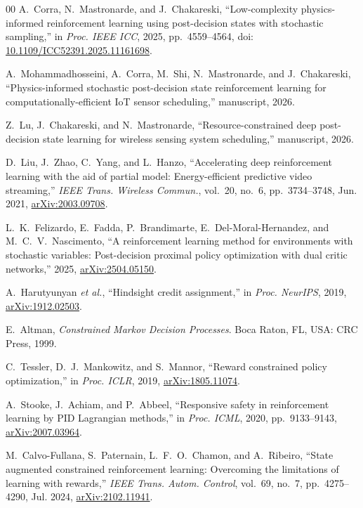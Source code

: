 \documentclass[conference]{IEEEtran}
\begin{document}
\begin{thebibliography}{00}
A.~Corra, N.~Mastronarde, and J.~Chakareski, ``Low-complexity physics-informed reinforcement learning using post-decision states with stochastic sampling,'' in \emph{Proc. IEEE ICC}, 2025, pp.~4559--4564, doi: \href{https://doi.org/10.1109/ICC52391.2025.11161698}{10.1109/ICC52391.2025.11161698}.

A.~Mohammadhosseini, A.~Corra, M.~Shi, N.~Mastronarde, and J.~Chakareski, ``Physics-informed stochastic post-decision state reinforcement learning for computationally-efficient IoT sensor scheduling,'' manuscript, 2026.

Z.~Lu, J.~Chakareski, and N.~Mastronarde, ``Resource-constrained deep post-decision state learning for wireless sensing system scheduling,'' manuscript, 2026.

D.~Liu, J.~Zhao, C.~Yang, and L.~Hanzo, ``Accelerating deep reinforcement learning with the aid of partial model: Energy-efficient predictive video streaming,'' \emph{IEEE Trans. Wireless Commun.}, vol.~20, no.~6, pp.~3734--3748, Jun. 2021, \href{https://arxiv.org/abs/2003.09708}{arXiv:2003.09708}.

L.~K.~Felizardo, E.~Fadda, P.~Brandimarte, E.~Del-Moral-Hernandez, and M.~C.~V.~Nascimento, ``A reinforcement learning method for environments with stochastic variables: Post-decision proximal policy optimization with dual critic networks,'' 2025, \href{https://arxiv.org/abs/2504.05150}{arXiv:2504.05150}.

A.~Harutyunyan \emph{et al.}, ``Hindsight credit assignment,'' in \emph{Proc. NeurIPS}, 2019, \href{https://arxiv.org/abs/1912.02503}{arXiv:1912.02503}.

E.~Altman, \emph{Constrained Markov Decision Processes}. Boca Raton, FL, USA: CRC Press, 1999.

C.~Tessler, D.~J.~Mankowitz, and S.~Mannor, ``Reward constrained policy optimization,'' in \emph{Proc. ICLR}, 2019, \href{https://arxiv.org/abs/1805.11074}{arXiv:1805.11074}.

A.~Stooke, J.~Achiam, and P.~Abbeel, ``Responsive safety in reinforcement learning by PID Lagrangian methods,'' in \emph{Proc. ICML}, 2020, pp.~9133--9143, \href{https://arxiv.org/abs/2007.03964}{arXiv:2007.03964}.

M.~Calvo-Fullana, S.~Paternain, L.~F.~O.~Chamon, and A.~Ribeiro, ``State augmented constrained reinforcement learning: Overcoming the limitations of learning with rewards,'' \emph{IEEE Trans. Autom. Control}, vol.~69, no.~7, pp.~4275--4290, Jul. 2024, \href{https://arxiv.org/abs/2102.11941}{arXiv:2102.11941}.


\end{thebibliography}
\end{document}
